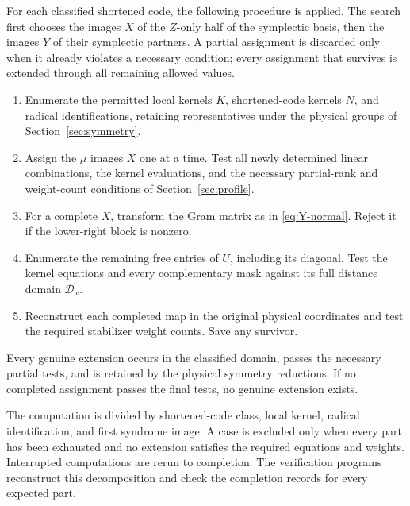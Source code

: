 For each classified shortened code, the following procedure is applied.
The search first chooses the images \(X\) of the \(Z\)-only half of the
symplectic basis, then the images \(Y\) of their symplectic partners.
A partial assignment is discarded only when it already violates a
necessary condition; every assignment that survives is extended through
all remaining allowed values.
\begin{enumerate}[label=\arabic*.]
\item Enumerate the permitted local kernels \(K\), shortened-code
kernels \(N\), and radical identifications, retaining representatives
under the physical groups of Section~\ref{sec:symmetry}.
\item Assign the \(\mu\) images \(X\) one at a time. Test all newly
determined linear combinations, the kernel evaluations, and the
necessary partial-rank and weight-count conditions of
Section~\ref{sec:profile}.
\item For a complete \(X\), transform the Gram matrix as in
\eqref{eq:Y-normal}. Reject it if the lower-right block is nonzero.
\item Enumerate the remaining free entries of \(U\), including its
diagonal. Test the kernel equations and every complementary mask
against its full distance domain \(\mathcal D_x\).
\item Reconstruct each completed map in the original physical coordinates
and test the required stabilizer weight counts. Save any survivor.
\end{enumerate}
Every genuine extension occurs in the classified domain, passes the
necessary partial tests, and is retained by the physical symmetry
reductions. If no completed assignment passes the final tests, no
genuine extension exists.

The computation is divided by shortened-code class, local kernel,
radical identification, and first syndrome image. A case is excluded
only when every part has been exhausted and no extension satisfies the
required equations and weights. Interrupted computations are rerun to
completion. The verification programs reconstruct this decomposition
and check the completion records for every expected part.
